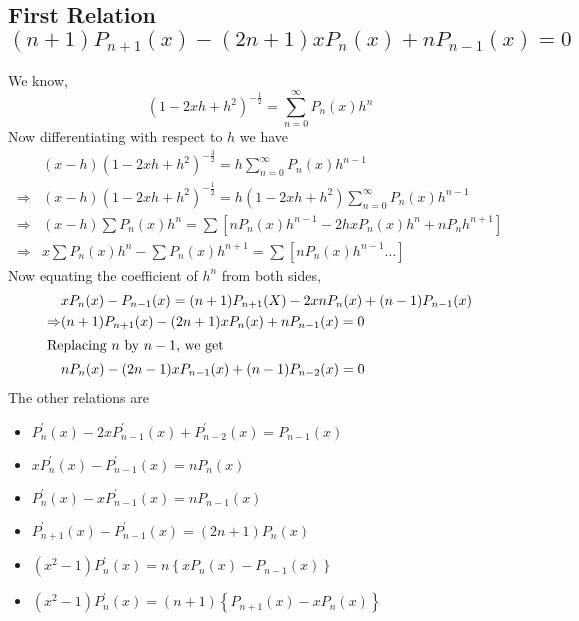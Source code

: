 \documentclass[../main-sheet.tex]{subfiles}
\begin{document}
\subsection{First Relation $ (n+1)P_{n+1}(x)-(2n+1)xP_n(x)+nP_{n-1}(x)=0 $}
We know,
\[
    \left(1-2xh+h^2\right)^{-\frac{1}{2}}=\sum_{n=0}^{\infty}P_n(x)h^n
\]
Now differentiating with respect to $ h $ we have 
\begin{align*}
    &(x-h)\left(1-2xh+h^2\right)^{-\frac{3}{2}}=h\sum_{n=0}^{\infty}P_n(x)h^{n-1}\\
    \Rightarrow&(x-h)\left(1-2xh+h^2\right)^{-\frac{1}{2}}=h\left(1-2xh+h^2\right)\sum_{n=0}^{\infty}P_n(x)h^{n-1}\\
    \Rightarrow& (x-h)\sum P_n(x)h^n=\sum\left[nP_n(x)h^{n-1}-2hxP_n(x)h^n+nP_nh^{n+1}\right]\\
    \Rightarrow &x\sum P_n(x)h^n-\sum P_n(x) h^{n+1}=\sum\left[nP_n(x)h^{n-1}\dots\right]
\end{align*}
Now equating the coefficient of $ h^n $ from both sides,
\begin{align*}
    &xP_n(x)-P_{n-1}(x)=(n+1)P_{n+1}(X)-2xnP_n(x)+(n-1)P_{n-1}(x)\\
    \Rightarrow& (n+1)P_{n+1}(x)-(2n+1)xP_n(x)+nP_{n-1}(x)=0\\
    \intertext{Replacing $ n $ by $ n-1 $, we get}
    & nP_{n}(x)-(2n-1)xP_{n-1}(x)+(n-1)P_{n-2}(x)=0\\
\end{align*}
The other relations are
\begin{itemize}
    \item $ P_n^{'}(x)-2xP_{n-1}^{'}(x)+P_{n-2}^{'}(x)=P_{n-1}(x) $
    \item $ xP_n^{'}(x)-P_{n-1}^{'}(x)=nP_{n}(x) $
    \item $ P_n^{'}(x)-xP_{n-1}^{'}(x)=nP_{n-1}(x) $
    \item $ P_{n+1}^{'}(x)-P_{n-1}^{'}(x)=(2n+1)P_{n}(x) $
    \item $ \left(x^2-1\right)P_{n}^{'}(x)=n\left\{xP_{n}(x)-P_{n-1}(x)\right\} $
    \item $ \left(x^2-1\right)P_{n}^{'}(x)=(n+1)\left\{P_{n+1}(x)-xP_{n}(x)\right\} $
\end{itemize}
\end{document}
